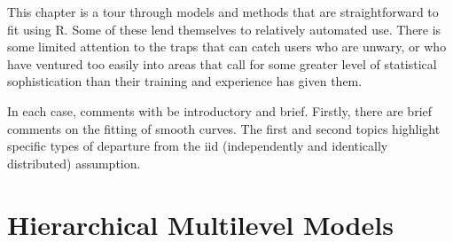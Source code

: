 






This chapter is a tour through models and methods that are
straightforward to fit using R.  Some of these lend themselves
to relatively automated use.   There is some limited attention
to the traps that can catch users who are unwary, or who have
ventured too easily into areas that call for some greater level
of statistical sophistication than their training and experience
has given them.

In each case, comments with be introductory and brief.  Firstly, there
are brief comments on the fitting of smooth curves.  The first and
second topics highlight specific types of departure from the iid
(independently and identically distributed) assumption.

\section{Hierarchical Multilevel Models}\label{sec:hmlm}


